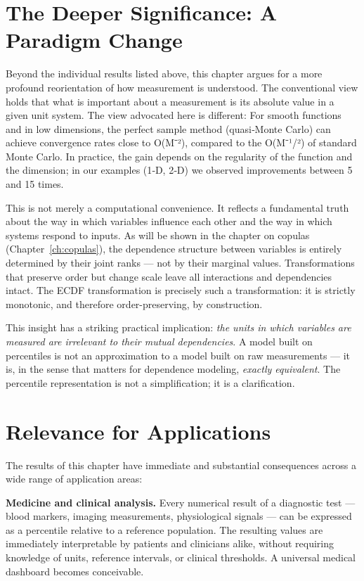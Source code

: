 \section{The Deeper Significance: A Paradigm Change}

Beyond the individual results listed above, this chapter argues for a more profound
reorientation of how measurement is understood. The conventional view holds that
what is important about a measurement is its absolute value in a given unit system.
The view advocated here is different: For smooth functions and in low dimensions, the perfect sample method (quasi‑Monte Carlo) can achieve convergence rates close to O(M⁻²), compared to the O(M⁻¹/²) of standard Monte Carlo. In practice, the gain depends on the regularity of the function and the dimension; in our examples (1‑D, 2‑D) we observed improvements between 5 and 15 times.

This is not merely a computational convenience. It reflects a fundamental truth about
the way in which variables influence each other and the way in which systems respond
to inputs. As will be shown in the chapter on copulas (Chapter~\ref{ch:copulas}),
the dependence structure between variables is entirely determined by their joint
ranks — not by their marginal values. Transformations that preserve order but change
scale leave all interactions and dependencies intact. The ECDF transformation
is precisely such a transformation: it is strictly monotonic, and therefore
order-preserving, by construction.

This insight has a striking practical implication: \emph{the units in which variables
are measured are irrelevant to their mutual dependencies}. A model built on percentiles
is not an approximation to a model built on raw measurements — it is, in the sense
that matters for dependence modeling, \emph{exactly equivalent}. The percentile
representation is not a simplification; it is a clarification.

\section{Relevance for Applications}

The results of this chapter have immediate and substantial consequences across a wide
range of application areas:

\noindent\textbf{Medicine and clinical analysis.} Every numerical result of a
diagnostic test — blood markers, imaging measurements, physiological signals — can be
expressed as a percentile relative to a reference population. The resulting values are
immediately interpretable by patients and clinicians alike, without requiring knowledge
of units, reference intervals, or clinical thresholds. A universal medical dashboard
becomes conceivable.

